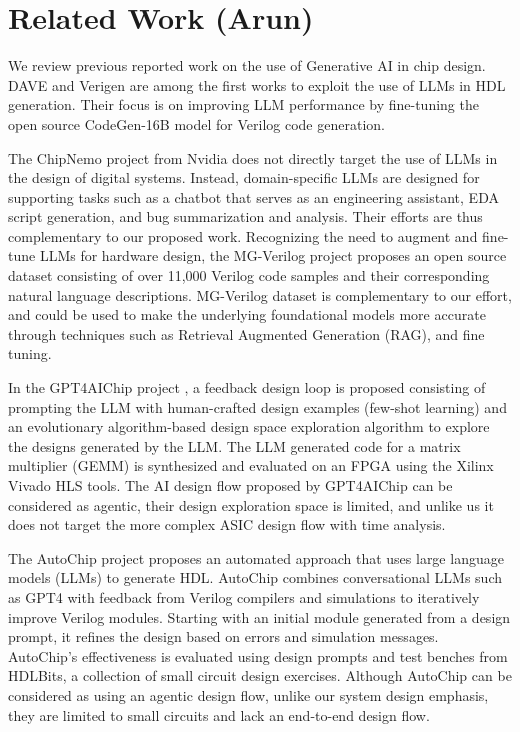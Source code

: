 \section{Related Work (Arun)}
\label{sec:related_work}
We review previous reported work on the use of Generative AI in chip design. DAVE \cite{dave} and Verigen \cite{verigen} are among the first works to exploit the use of LLMs in HDL generation. Their focus is on improving LLM performance by fine-tuning the open source CodeGen-16B model for Verilog code generation. 

The ChipNemo project \cite{chipnemo} from Nvidia does not directly target the use of LLMs in the design of digital systems. Instead, domain-specific LLMs are designed for supporting tasks such as a chatbot that serves as an engineering assistant, EDA script generation, and bug summarization and analysis. Their efforts are thus complementary to our proposed work. Recognizing the need to augment and fine-tune LLMs for hardware design, the MG-Verilog \cite{mg-verilog} project proposes an open source dataset consisting of over 11,000 Verilog code samples and their corresponding natural language descriptions. MG-Verilog dataset is complementary to our effort, and could be used to make the underlying foundational models more accurate through techniques such as Retrieval Augmented Generation (RAG), and fine tuning.  

In the GPT4AIChip project \cite{gpt4aigchip}, a feedback design loop is proposed consisting of prompting the LLM with human-crafted design examples (few-shot learning) and an evolutionary algorithm-based design space exploration algorithm to explore the designs generated by the LLM.  The LLM generated code for a matrix multiplier (GEMM) is synthesized and evaluated on an FPGA using the Xilinx Vivado HLS tools. The AI design flow proposed by GPT4AIChip can be considered as agentic, their design exploration space is limited, and unlike us it does not target the more complex ASIC design flow with time analysis. 

The AutoChip \cite{autochip} project proposes an automated approach that uses large language models (LLMs) to generate HDL. AutoChip combines conversational LLMs such as GPT4 with feedback from Verilog compilers and simulations to iteratively improve Verilog modules. Starting with an initial module generated from a design prompt, it refines the design based on errors and simulation messages. AutoChip's effectiveness is evaluated using design prompts and test benches from HDLBits, a collection of small circuit design exercises. Although AutoChip can be considered as using an agentic design flow, unlike our system design emphasis, they are limited to small circuits and lack an end-to-end design flow. 

\cite{thakur2024verigen}
 
